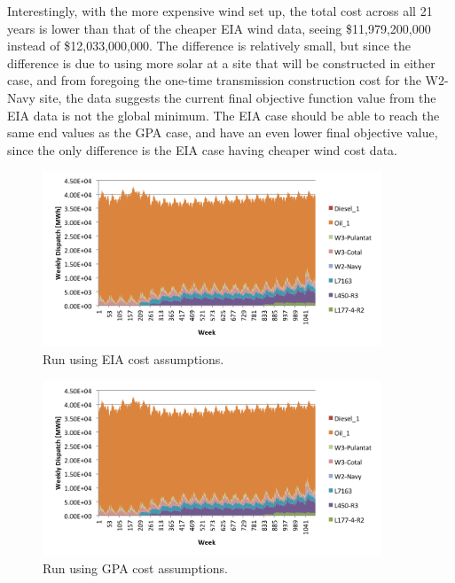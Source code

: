 \documentclass[12pt,letterpaper,fleqn]{article}
\begin{document}
Interestingly, with the more expensive wind set up, the total cost
across all 21 years is lower than that of the cheaper EIA wind data,
seeing \$11,979,200,000 instead of \$12,033,000,000. The difference is
relatively small, but since the difference is due to using more solar
at a site that will be constructed in either case, and from foregoing
the one-time transmission construction cost for the W2-Navy site, the
data suggests the current final objective function value from the EIA
data is not the global minimum. The EIA case should be able to reach
the same end values as the GPA case, and have an even lower final
objective value, since the only difference is the EIA case having
cheaper wind cost data.

\begin{figure}[!h]
  \centering
  \includegraphics[width=0.9\textwidth]{img/cost_eia}
  \caption{Run using EIA cost assumptions.}
  \label{fig:cost_eia}
\end{figure}

\begin{figure}[!h]
  \centering
  \includegraphics[width=0.9\textwidth]{img/cost_gpa}
  \caption{Run using GPA cost assumptions.}
  \label{fig:cost_gpa}
\end{figure}
\end{document}
